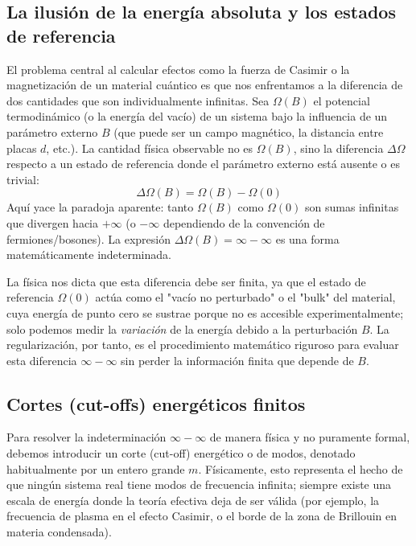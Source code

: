 \subsection{La ilusión de la energía absoluta y los estados de referencia}

El problema central al calcular efectos como la fuerza de Casimir o la magnetización de un material cuántico es que nos enfrentamos a la diferencia de dos cantidades que son individualmente infinitas. Sea $\Omega(B)$ el potencial termodinámico (o la energía del vacío) de un sistema bajo la influencia de un parámetro externo $B$ (que puede ser un campo magnético, la distancia entre placas $d$, etc.). La cantidad física observable no es $\Omega(B)$, sino la diferencia $\Delta \Omega$ respecto a un estado de referencia donde el parámetro externo está ausente o es trivial:
$$ \Delta \Omega(B) = \Omega(B) - \Omega(0) $$
Aquí yace la paradoja aparente: tanto $\Omega(B)$ como $\Omega(0)$ son sumas infinitas que divergen hacia $+\infty$ (o $-\infty$ dependiendo de la convención de fermiones/bosones). La expresión $\Delta \Omega(B) = \infty - \infty$ es una forma matemáticamente indeterminada. 

La física nos dicta que esta diferencia debe ser finita, ya que el estado de referencia $\Omega(0)$ actúa como el "vacío no perturbado" o el "bulk" del material, cuya energía de punto cero se sustrae porque no es accesible experimentalmente; solo podemos medir la \textit{variación} de la energía debido a la perturbación $B$. La regularización, por tanto, es el procedimiento matemático riguroso para evaluar esta diferencia $\infty - \infty$ sin perder la información finita que depende de $B$.

\subsection{Cortes (cut-offs) energéticos finitos}

Para resolver la indeterminación $\infty - \infty$ de manera física y no puramente formal, debemos introducir un corte (cut-off) energético o de modos, denotado habitualmente por un entero grande $m$. Físicamente, esto representa el hecho de que ningún sistema real tiene modos de frecuencia infinita; siempre existe una escala de energía donde la teoría efectiva deja de ser válida (por ejemplo, la frecuencia de plasma en el efecto Casimir, o el borde de la zona de Brillouin en materia condensada).

